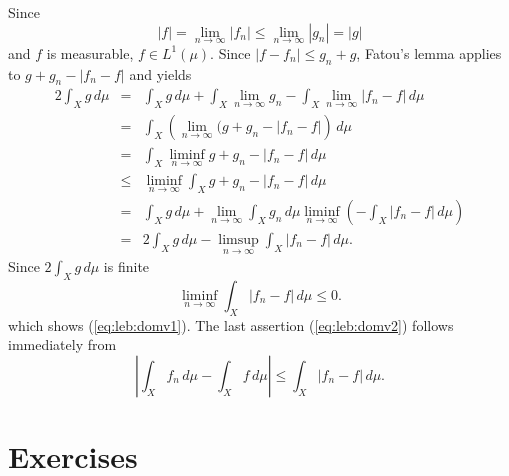 \begin{thmproof}
Since
\begin{equation*}
 |f| = \lim_{n\to\infty} |f_n| \leq \lim_{n\to\infty} |g_n| = |g|
\end{equation*}
and $f$ is measurable, \(f\in L^1(\mu)\).
Since \(|f-f_n|\leq g_n + g\),
Fatou's lemma applies to \(g + g_n - |f_n - f|\) and yields
\begin{eqnarray*}
 2 \int_X g\,d\mu
 &=& \int_X g\,d\mu
     + \int_X \lim_{n\to\infty}g_n
     - \int_X \lim_{n\to\infty}|f_n - f|\,d\mu \\
 &=& \int_X \left(\lim_{n\to\infty}(g + g_n  - |f_n - f|\right)\,d\mu \\
 &=& \int_X \liminf_{n\to\infty} g + g_n  - |f_n - f|\,d\mu \\
 &\leq& \liminf_{n\to\infty}\int_X g + g_n  - |f_n - f|\,d\mu \\
 &=& \int_X g\,d\mu
     + \lim_{n\to\infty} \int_X g_n\,d\mu
     \liminf_{n\to\infty} \left(-\int_X |f_n - f|\,d\mu\right) \\
 &=& 2\int_X g\,d\mu - \limsup_{n\to\infty} \int_X |f_n - f|\,d\mu .
\end{eqnarray*}
Since \(2\int_X g\,d\mu\) is finite
\begin{equation*}
 \liminf_{n\to\infty} \int_X |f_n - f|\,d\mu \leq 0.
\end{equation*}
which shows (\ref{eq:leb:domv1}).
The last assertion (\ref{eq:leb:domv2}) follows immediately from
\begin{equation*}
 \left| \int_X f_n\,d\mu - \int_X f\,d\mu\right|  \leq \int_X |f_n - f|\,d\mu.
\end{equation*}
\end{thmproof}





\section{Exercises} %

